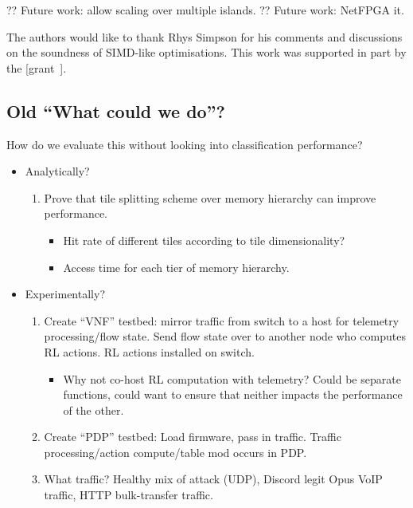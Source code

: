 \documentclass[sigconf,natbib=false]{acmart}
\begin{document}
?? Future work: allow scaling over multiple islands.
?? Future work: NetFPGA it.

\begin{acks}
	The authors would like to thank Rhys Simpson for his comments and discussions on the soundness of SIMD-like optimisations.
	This work was supported in part by the  [grant~].
\end{acks}
	
%
%
\printbibliography

\begin{appendices}
	\section{Old ``What could we do''?}
	How do we evaluate this without looking into classification performance?
	\begin{itemize}
		\item Analytically?
		\begin{enumerate}
			\item Prove that tile splitting scheme over memory hierarchy can improve performance.
			\begin{itemize}
				\item Hit rate of different tiles according to tile dimensionality?
				\item Access time for each tier of memory hierarchy.
			\end{itemize}
		\end{enumerate}
		\item Experimentally?
		\begin{enumerate}
			\item Create ``VNF'' testbed: mirror traffic from switch to a host for telemetry processing/flow state. Send flow state over to another node who computes RL actions. RL actions installed on switch.
			\begin{itemize}
				\item Why not co-host RL computation with telemetry? Could be separate functions, could want to ensure that neither impacts the performance of the other.
			\end{itemize}
			\item Create ``PDP'' testbed: Load firmware, pass in traffic. Traffic processing/action compute/table mod occurs in PDP.
			\item What traffic? Healthy mix of attack (UDP), Discord legit Opus VoIP traffic, HTTP bulk-transfer traffic.

\end{enumerate}
\end{itemize}
\end{appendices}
\end{document}

